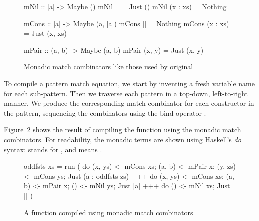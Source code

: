 \begin{figure}
\begin{hscode}
mNil :: [a] -> Maybe ()
mNil [] = Just ()
mNil (x : xs) = Nothing
\end{hscode}
\begin{hscode}
mCons :: [a] -> Maybe (a, [a])
mCons [] = Nothing
mCons (x : xs) = Just (x, xs)
\end{hscode}
\begin{hscode}
mPair :: (a, b) -> Maybe (a, b)
mPair (x, y) = Just (x, y)
\end{hscode}
\caption{Monadic match combinators like those used by original {\fixrec}}
\label{fig:old-fixrec-combinators}
\end{figure}

To compile a pattern match equation, we start by inventing a fresh variable name for each sub-pattern. Then we traverse each pattern in a top-down, left-to-right manner. We produce the corresponding match combinator for each constructor in the pattern, sequencing the combinators using the bind operator \hs{({>}>=)}.

Figure~\ref{fig:old-fixrec-compiled} shows the result of compiling the function  using the monadic match combinators. For readability, the monadic terms are shown using Haskell's \emph{do} syntax:  stands for , and  means .

\begin{figure}
\begin{hscode}
oddfsts xs = run (
  do { (x, ys) <- mCons xs;
       (a, b) <- mPair x;
       (y, zs) <- mCons ys;
       Just (a : oddfsts zs) }
  +++
  do { (x, ys) <- mCons xs;
       (a, b) <- mPair x;
       () <- mNil ys;
       Just [a] }
  +++
  do { () <- mNil xs;
       Just [] } )
\end{hscode}
\caption{A function compiled using monadic match combinators}
\label{fig:old-fixrec-compiled}
\end{figure}

